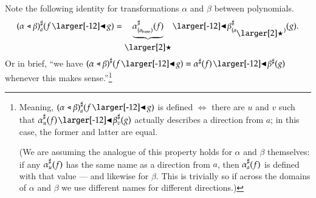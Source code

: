 \documentclass{amsart}
\begin{document}
\iffalse
  Suppose we have polynomials $P$ and $Q$ and the following
  structure relating them.
  \begin{itemize}
  \item A function $\alpha_1$ from the positions of $P$ to the
    positions of $Q$.
  \item For each position $a$ in $P$, a function $\alpha^\sharp_a$ from the
    directions of $\alpha(a)$ back to the directions of $a$.
  \end{itemize}
  This is called a \emph{transformation} from $P$ to $Q$ (written
  $\alpha: P \to Q$).

  We think of this as a way of replacing each corolla from $P$ with a
  a corolla from $Q$.


  The \emph{composite} of transformations $\alpha : P \to Q$ and
  $\beta : Q \to R$, denoted $\alpha \fatsemi \beta : P \to R$,
  is defined by
  \[
    \posmap{(\alpha \fatsemi \beta)}{a} = \posmap{\beta}{\posmap{\alpha}{a}}
    \quad \text{ and } \quad
    \dirmap{(\alpha \fatsemi \beta)}{a}{f} =
    \dirmap{\alpha}{a}{\dirmap{\beta}{\posmap{\alpha}{a}}{f}},
  \] i.e., we do the corolla replacements in order.


  This definition of transformation plays well with the substitution
  product.

\fi

Note the following identity for transformations $\alpha$ and $\beta$
between polynomials.
\[\dirmap{(\alpha \sub \beta)}{a}{f \subd g} = \underbrace{\dirmap{\alpha}{(a_\base)}{f}}_{\backref}
  \subd \dirmap{\beta}{(a_{\backref})}{g}.\] Or in brief, ``we have
$\anydirmap{(\alpha \sub \beta)}{f \subd g} = \anydirmap{\alpha}{f}
\subd\anydirmap{\beta}{g}$ whenever this makes sense.''\footnote{Meaning,
  ${\dirmap{(\alpha \sub \beta)}{a}{f \subd g}}$ is defined $\iff$
  there are $u$ and $v$ such that
  ${\dirmap{\alpha}{u}{f} \subd \dirmap{\beta}{v}{g}}$ actually
  describes a direction from $a$; in this case, the former and latter
  are equal.
  
  (We are assuming the analogue of this property holds for $\alpha$
  and $\beta$ themselves: if any ${\alpha}^\sharp_{u}(f)$ has the same
  name as a direction from $a$, then ${\alpha}^\sharp_{a}(f)$ is
  defined with that value --- and likewise for $\beta$. This is
  trivially so if across the domains of $\alpha$ and $\beta$ we use
  different names for different directions.)
}
\end{document}
